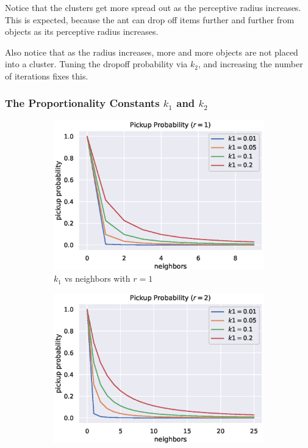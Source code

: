 \documentclass[12pt]{article}
\begin{document}
Notice that the clusters get more spread out as the perceptive radius increases.
This is expected, because the ant can drop off items further and further from objects as its perceptive radius increases.

Also notice that as the radius increases, more and more objects are not placed into a cluster. Tuning the dropoff probability via $k_2$, and increasing the number of iterations fixes this.

\subsubsection{The Proportionality Constants $k_1$ and $k_2$}
\begin{figure}[H]
    \begin{subfigure}[t]{0.32\textwidth}
        \centering
        \includegraphics[width=\textwidth]{figures/aca/k1-r1.eps}
        \caption{$k_1$ vs neighbors with $r=1$}
    \end{subfigure}%
    \begin{subfigure}[t]{0.32\textwidth}
        \centering
        \includegraphics[width=\textwidth]{figures/aca/k1-r2.eps}

\end{subfigure}
\end{figure}
\end{document}
